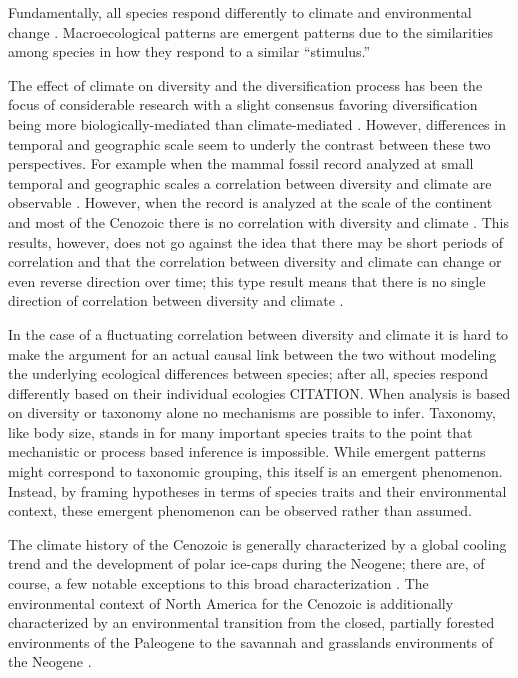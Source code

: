 \documentclass[12pt,letterpaper]{article}
\begin{document}
Fundamentally, all species respond differently to climate and environmental change \citep{Blois2009}. Macroecological patterns are emergent patterns due to the similarities among species in how they respond to a similar ``stimulus.''

The effect of climate on diversity and the diversification process has been the focus of considerable research with a slight consensus favoring diversification being more biologically-mediated than climate-mediated \citep{Alroy1996a,Alroy2000g,Figueirido2012,Clyde1998a}. However, differences in temporal and geographic scale seem to underly the contrast between these two perspectives. For example when the mammal fossil record analyzed at small temporal and geographic scales a correlation between diversity and climate are observable \citep{Clyde1998a}. However, when the record is analyzed at the scale of the continent and most of the Cenozoic there is no correlation with diversity and climate \citep{Alroy2000g}. This results, however, does not go against the idea that there may be short periods of correlation and that the correlation between diversity and climate can change or even reverse direction over time; this type result means that there is no single direction of correlation between diversity and climate \citep{Figueirido2012}. 

In the case of a fluctuating correlation between diversity and climate it is hard to make the argument for an actual causal link between the two without modeling the underlying ecological differences between species; after all, species respond differently based on their individual ecologies CITATION. When analysis is based on diversity or taxonomy alone no mechanisms are possible to infer. Taxonomy, like body size, stands in for many important species traits to the point that mechanistic or process based inference is impossible. While emergent patterns might correspond to taxonomic grouping, this itself is an emergent phenomenon. Instead, by framing hypotheses in terms of species traits and their environmental context, these emergent phenomenon can be observed rather than assumed.

The climate history of the Cenozoic is generally characterized by a global cooling trend and the development of polar ice-caps during the Neogene; there are, of course, a few notable exceptions to this broad characterization \citep{Zachos2001,Zachos2008,Cramer2011}. The environmental context of North America for the Cenozoic is additionally characterized by an environmental transition from the closed, partially forested environments of the Paleogene to the savannah and grasslands environments of the Neogene \citep{Blois2009,Janis1993b,Janis2000,Stromberg2005}.
\end{document}
